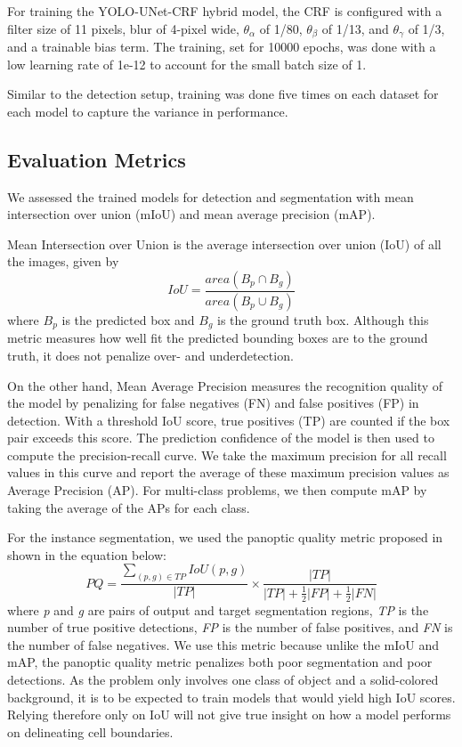 \documentclass[10pt, journal, compsoc]{IEEEtran}
\begin{document}
For training the YOLO-UNet-CRF hybrid model, the CRF is configured with a filter size of 11 pixels, blur of 4-pixel wide, $\theta_\alpha$ of 1/80, $\theta_\beta$ of 1/13, and $\theta_\gamma$ of 1/3, and a trainable bias term. The training, set for 10000 epochs, was done with a low learning rate of 1e-12 to account for the small batch size of 1. 

Similar to the detection setup, training was done five times on each dataset for each model to capture the variance in performance.
\subsection{Evaluation Metrics}
We assessed the trained models for detection and segmentation with mean intersection over union (mIoU) and mean average precision (mAP). 

Mean Intersection over Union is the average intersection over union (IoU) of all the images, given by
\begin{equation}
IoU = \frac{area(B_{p}\cap B_{g})}{area(B_{p}\cup B_{g})}
\end{equation}
where \textit{$B_p$} is the predicted box and \textit{$B_g$} is the ground truth box. Although this metric measures how well fit the predicted bounding boxes are to the ground truth, it does not penalize over- and underdetection.

On the other hand, Mean Average Precision measures the recognition quality of the model by penalizing for false negatives (FN) and false positives (FP) in detection. With a threshold IoU score, true positives (TP) are counted if the box pair exceeds this score. The prediction confidence of the model is then used to compute the precision-recall curve. We take the maximum precision for all recall values in this curve and report the average of these maximum precision values as Average Precision (AP). For multi-class problems, we then compute mAP by taking the average of the APs for each class.

For the instance segmentation, we used the panoptic quality metric proposed in \cite{DBLP:journals/corr/abs-1801-00868} shown in the equation below:
\begin{equation}
PQ = \frac{\sum_{(p,g)\in TP}IoU(p,g)}{|TP|} \times \frac{|TP|}{|TP| + \frac{1}{2}|FP| + \frac{1}{2}|FN|}
\end{equation}
where \textit{p} and \textit{g} are pairs of output and target segmentation regions, \textit{TP} is the number of true positive detections, \textit{FP} is the number of false positives, and \textit{FN} is the number of false negatives. We use this metric because unlike the mIoU and mAP, the panoptic quality metric penalizes both poor segmentation and poor detections. As the problem only involves one class of object and a solid-colored background, it is to be expected to train models that would yield high IoU scores. Relying therefore only on IoU will not give true insight on how a model performs on delineating cell boundaries.
\end{document}
